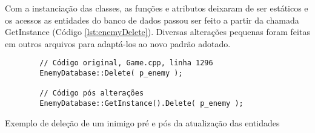 Com a instanciação das classes, as funções e atributos deixaram de ser estáticos e os acessos 
as entidades do banco de dados passou ser feito a partir da chamada GetInstance (Código \ref{lst:enemyDelete}). 
Diversas alterações pequenas foram feitas em outros arquivos para adaptá-los ao novo padrão adotado.

\begin{listing}[!ht]
    \begin{verbatim}
        // Código original, Game.cpp, linha 1296
        EnemyDatabase::Delete( p_enemy );

        // Código pós alterações
        EnemyDatabase::GetInstance().Delete( p_enemy );
    \end{verbatim}
\caption{Exemplo de deleção de um inimigo pré e pós da atualização das entidades}
\label{lst:enemyDelete}
\end{listing}